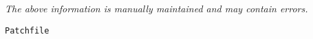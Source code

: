 \label{pkg:patchfile}

{\tiny \it The above information is manually maintained and may contain errors.}
\begin{verbatim}
Patchfile
\end{verbatim}
